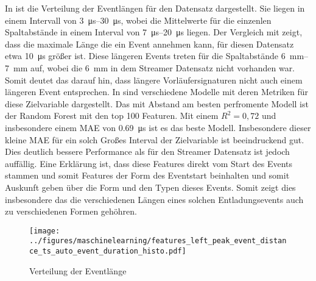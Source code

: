 In  ist die Verteilung der Eventlängen für den Datensatz dargestellt. Sie liegen in einem Intervall von \SIrange{3}{30}{\micro\second}, wobei die Mittelwerte für die einzenlen Spaltabstände in einem Interval von \SIrange{7}{20}{\micro\second} liegen. Der Vergleich mit  zeigt, dass die maximale Länge die ein Event annehmen kann, für diesen Datensatz etwa \SI{10}{\micro\second} größer ist. Diese längeren Events treten für die Spaltabstände \SIrange{6}{7}{\milli\meter} auf, wobei die \SI{6}{\milli\meter} in dem Streamer Datensatz nicht vorhanden war. Somit deutet das darauf hin, dass längere Vorläufersignaturen nicht auch einem längeren Event entsprechen. In  sind verschiedene Modelle mit deren Metriken für diese Zielvariable dargestellt. Das mit Abstand am besten perfromente Modell ist der Random Forest mit den top 100 Featuren. Mit einem \(R^2 = 0,72\) und insbesondere einem MAE von \SI{0,69}{\micro\second} ist es das beste Modell. Insbesondere dieser kleine MAE für ein solch Großes Interval der Zielvariable ist beeindruckend gut. Dies deutlich bessere Performance als für den Streamer Datensatz ist jedoch auffällig. Eine Erklärung ist, dass diese Features direkt vom Start des Events stammen und somit Features der Form des Eventstart beinhalten und somit Auskunft geben über die Form und den Typen dieses Events. Somit zeigt dies insbesondere das die verschiedenen Längen eines solchen Entladungsevents auch zu verschiedenen Formen gehöhren.

\begin{figure}[H]
    \centering
      \texttt{[image: ../figures/maschinelearning/features\_left\_peak\_event\_distance\_ts\_auto\_event\_duration\_histo.pdf]}
      \caption{Verteilung der Eventlänge}
      \label{fig:event_left_event_duration_box}
\end{figure}

